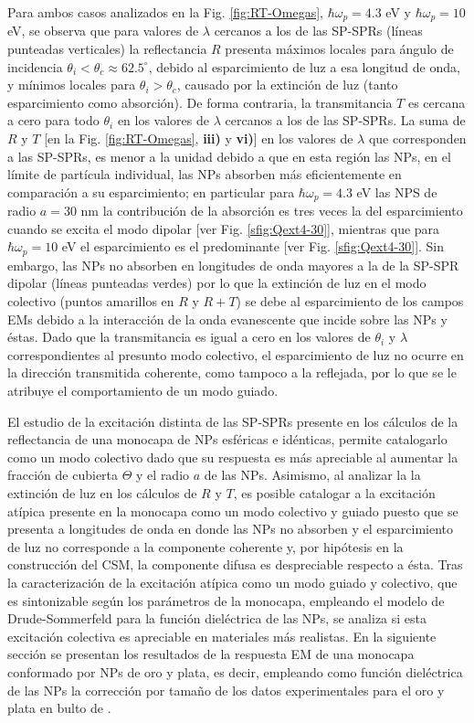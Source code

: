 Para ambos casos analizados en la Fig. \ref{fig:RT-Omegas}, $\hbar\omega_p = 4.3$ eV y $\hbar\omega_p = 10$ eV, se observa que para valores de $\lambda$ cercanos a los de las SP-SPRs (líneas punteadas verticales) la reflectancia $R$ presenta máximos locales para ángulo de incidencia $\theta_i<\theta_c \approx 62.5^\circ$, debido al esparcimiento de luz a esa longitud de onda, y mínimos locales para $\theta_i>\theta_c$, causado por la extinción de luz (tanto esparcimiento como absorción). De forma contraria, la transmitancia $T$ es cercana a cero para todo $\theta_i$ en los valores de $\lambda$ cercanos a los de las SP-SPRs. La suma de $R$ y $T$ [en la Fig. \ref{fig:RT-Omegas}, \textbf{iii)} y \textbf{vi)}] en los valores de $\lambda$ que corresponden a las SP-SPRs, es menor a la unidad debido a que en esta región las NPs, en el límite de partícula individual, las NPs absorben más eficientemente en comparación a su esparcimiento; en particular para $\hbar\omega_p=4.3$ eV las NPS de radio $a= 30$ nm la contribución de la absorción es tres veces la del esparcimiento cuando se excita el modo dipolar [ver Fig. \ref{sfig:Qext4-30}], mientras que para $\hbar\omega_p = 10$ eV el esparcimiento es el predominante [ver Fig. \ref{sfig:Qext4-30}]. Sin embargo, las NPs no absorben en longitudes de onda mayores a la de la SP-SPR dipolar (líneas punteadas verdes) por lo que la extinción de luz en el modo colectivo (puntos amarillos en $R$ y $R+T$) se debe al esparcimiento de los campos EMs debido a la interacción de la onda evanescente que incide sobre las NPs y éstas. Dado que la transmitancia es igual a cero en los valores de $\theta_i$ y $\lambda$ correspondientes al presunto modo colectivo, el esparcimiento de luz no ocurre en la dirección transmitida coherente, como tampoco a la reflejada, por lo que se le atribuye el comportamiento de un modo guiado.

El estudio de la excitación distinta de las SP-SPRs presente en los cálculos de la reflectancia de una monocapa de NPs esféricas e idénticas, permite catalogarlo como un modo colectivo dado que su respuesta es más apreciable al aumentar la fracción de cubierta $\Theta$ y el radio $a$ de las NPs. Asimismo, al analizar la la extinción de luz  en los cálculos de $R$ y $T$, es posible catalogar a la excitación atípica presente en la monocapa como un modo colectivo y guiado puesto que se presenta a longitudes de onda en donde las NPs no absorben y el esparcimiento de luz no corresponde a la componente coherente y, por hipótesis en la construcción del CSM, la componente difusa es despreciable respecto a ésta. Tras la caracterización de la excitación atípica como un modo guiado y colectivo, que es sintonizable según los parámetros de la monocapa, empleando el modelo de Drude-Sommerfeld para la función dieléctrica de las NPs, se analiza si esta excitación colectiva es apreciable en materiales más realistas. En la siguiente sección se presentan los resultados de la respuesta EM de una monocapa conformado por NPs de oro y plata, es decir, empleando como función dieléctrica de las NPs la corrección por tamaño de los datos experimentales para el oro y plata en bulto de \cite{johnson1972constants}.

